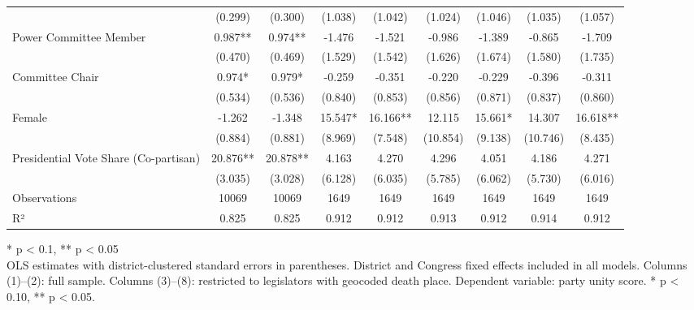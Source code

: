\begin{table}[t]
\begin{tabular*}{\linewidth}{@{\extracolsep{\fill}}lcccccccc}
 & (0.299) & (0.300) & (1.038) & (1.042) & (1.024) & (1.046) & (1.035) & (1.057) \\ 
Power Committee Member & 0.987** & 0.974** & -1.476 & -1.521 & -0.986 & -1.389 & -0.865 & -1.709 \\ 
 & (0.470) & (0.469) & (1.529) & (1.542) & (1.626) & (1.674) & (1.580) & (1.735) \\ 
Committee Chair & 0.974* & 0.979* & -0.259 & -0.351 & -0.220 & -0.229 & -0.396 & -0.311 \\ 
 & (0.534) & (0.536) & (0.840) & (0.853) & (0.856) & (0.871) & (0.837) & (0.860) \\ 
Female & -1.262 & -1.348 & 15.547* & 16.166** & 12.115 & 15.661* & 14.307 & 16.618** \\ 
 & (0.884) & (0.881) & (8.969) & (7.548) & (10.854) & (9.138) & (10.746) & (8.435) \\ 
Presidential Vote Share (Co-partisan) & 20.876** & 20.878** & 4.163 & 4.270 & 4.296 & 4.051 & 4.186 & 4.271 \\ 
{} & {(3.035)} & {(3.028)} & {(6.128)} & {(6.035)} & {(5.785)} & {(6.062)} & {(5.730)} & {(6.016)} \\ 
Observations & 10069 & 10069 & 1649 & 1649 & 1649 & 1649 & 1649 & 1649 \\ 
R² & 0.825 & 0.825 & 0.912 & 0.912 & 0.913 & 0.912 & 0.914 & 0.912 \\ 
\bottomrule
\end{tabular*}
\begin{minipage}{\linewidth}
\vspace{.05em}
* p < 0.1, ** p < 0.05\\
OLS estimates with district-clustered standard errors in parentheses. District and Congress fixed effects included in all models. Columns (1)–(2): full sample. Columns (3)–(8): restricted to legislators with geocoded death place. Dependent variable: party unity score. * p < 0.10, ** p < 0.05.\\
\end{minipage}
\end{table}

